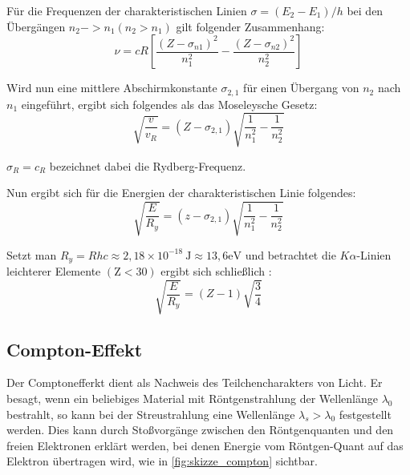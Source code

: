 \documentclass[12pt,english,ngerman]{scrartcl}
\begin{document}
Für die Frequenzen der charakteristischen Linien $\sigma=\left(E_2-E_1\right) /
	h$ bei den Übergängen $n_2->n_1\left(n_2>n_1\right)$ gilt folgender
Zusammenhang:
\begin{equation}
	\nu=c R\left[\frac{\left(Z-\sigma_{n 1}\right)^2}{n_1^2}-\frac{\left(Z-\sigma_{n 2}\right)^2}{n_2^2}\right]
	\label{eq:frequenz}
\end{equation}

Wird nun eine mittlere Abschirmkonstante $\sigma_{2,1}$ für einen Übergang von
$n_2$ nach $n_1$ eingeführt, ergibt sich folgendes als das Moseleysche Gesetz:
\begin{equation}
	\sqrt{\frac{v}{v_R}}=\left(Z-\sigma_{2,1}\right) \sqrt{\frac{1}{n_1^2}-\frac{1}{n_2^2}}
	\label{eq:Moseley}
\end{equation}

$\sigma_R=c_R$ bezeichnet dabei die Rydberg-Frequenz.

Nun ergibt sich für die Energien der charakteristischen Linie folgendes:
\begin{equation}
	\sqrt{\frac{E}{R_y}}=\left(z-\sigma_{2,1}\right) \sqrt{\frac{1}{n_1^2}-\frac{1}{n_2^2}}
	\label{eq:energie_zusammenhang}
\end{equation}

Setzt man $R_y=R h c \approx 2,18 \times 10^{-18} \mathrm{~J} \approx 13,6
	\mathrm{eV}$ und betrachtet die $K \alpha$-Linien leichterer Elemente
$(\mathrm{Z}<30)$ ergibt sich schließlich \cite{koller_experimente_nodate}:
\begin{equation}
	\sqrt{\frac{E}{R_y}}=(Z-1) \sqrt{\frac{3}{4}}
	\label{eq:energie_zusammenhang_annaeherung}
\end{equation}

\subsection{Compton-Effekt}

Der Comptonefferkt dient als Nachweis des Teilchencharakters von Licht. Er
besagt, wenn ein beliebiges Material mit Röntgenstrahlung der Wellenlänge
$\lambda_0$ bestrahlt, so kann bei der Streustrahlung eine Wellenlänge
$\lambda_s > \lambda_0$ festgestellt werden. Dies kann durch Stoßvorgänge
zwischen den Röntgenquanten und den freien Elektronen erklärt werden, bei denen
Energie vom Röntgen-Quant auf das Elektron übertragen wird, wie in
\autoref{fig:skizze_compton} sichtbar.
\end{document}

